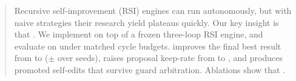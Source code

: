 %
\begin{abstract}
Recursive self-improvement (RSI) engines can run autonomously, but with naive strategies their research yield plateaus quickly.  Our key insight is that . We implement  on top of a frozen three-loop RSI engine, and evaluate on  under matched cycle budgets.  improves the final best result from  to  ($\pm$  over  seeds), raises proposal keep-rate from  to , and produces  promoted self-edits that survive guard arbitration. Ablations show that .
\end{abstract}
